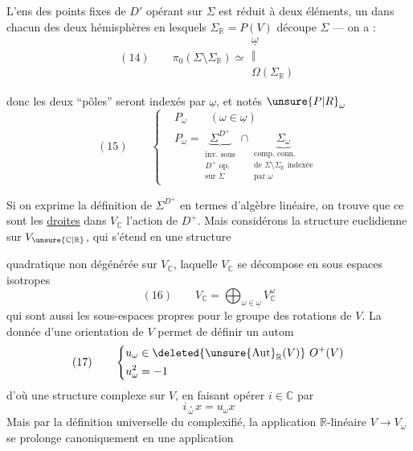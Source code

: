 
L’ens des points fixes de $D'$ opérant sur
$\Sigma$ est  réduit à deux éléments,
un dans chacun des deux hémisphères
en lesquels $\Sigma_{\mathbb R}=P(V)$ découpe $\Sigma$ —
on a :
\[
(14)\qquad \pi_0(\Sigma\setminus\Sigma_{\mathbb R})\simeq
\begin{gathered}\underline\omega\\[-.5ex]\Vert\\[-.5ex]\Omega(\Sigma_{\mathbb R})\end{gathered}
\]

donc les deux “pôles” seront indexés par
$\underline\omega$, et notés $\unsure{P|R}_\omega$
\[
(15)\qquad\left\{
\begin{aligned}
&P_\omega\qquad(\omega\in\underline\omega)\\
&P_\omega=\underbrace{\Sigma^{D^+}}_{\substack{\text{inv. sous}\\D^+\text{ op.}\\\text{sur }\Sigma}}
\cap\underbrace{\Sigma_\omega}_{\substack{\text{comp. conn.}\\\text{de }\Sigma\setminus\Sigma_{\mathbb R}\text{ indexée}\\\text{par }\omega}}
\end{aligned}\right.
\]

Si on exprime la définition de $\Sigma^{D^+}$ en
termes d’algèbre linéaire, on trouve que
ce sont les \uline{droites}  dans $V_{\mathbb C}$
 
l’action de $D^+$. Mais considérons
la  structure euclidienne sur $V_{\unsure{\mathbb C|\mathbb R}}$,
qui  s’étend en une structure


quadratique non dégénérée sur $V_{\mathbb C}$,
 laquelle $V_{\mathbb C}$ se décompose en
sous espaces isotropes
\[
(16)\qquad V_{\mathbb C}=\bigoplus_{\omega\in\underline\omega}V_{\mathbb C}^{\omega}
\]
qui sont aussi les sous-espaces propres
pour le groupe  des rotations de $V$.
La donnée d’une orientation \inserted{$\omega$} de $V$
permet de définir un autom 
\[
(17)\qquad\left\{\begin{aligned}
&u_\omega\in\deleted{\unsure{\operatorname{Aut}}_{\mathbb R}(V)}\ O^+(V)\\
&u_\omega^2=-1
\end{aligned}\right.
\]
d’où une structure complexe sur
$V$, en faisant opérer $i\in\mathbb C$ par
\[
i\mathbin{\underset{\omega}{\cdot}}x=u_\omega x
\]
Mais par la définition universelle du
complexifié, la  application
$\mathbb R$-linéaire $V\longrightarrow V_\omega$ se prolonge
canoniquement en une application

